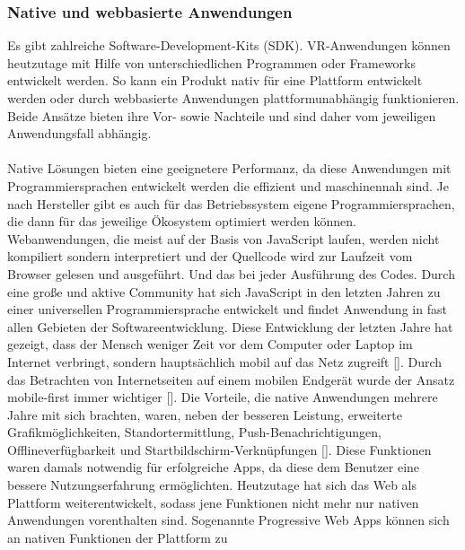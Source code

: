 \documentclass[a4paper,12pt,oneside]{article}
\begin{document}
      \subsubsection{Native und webbasierte Anwendungen}
        Es gibt zahlreiche Software-Development-Kits (SDK).
        VR-Anwendungen können heutzutage mit Hilfe von unterschiedlichen Programmen oder Frameworks entwickelt
        werden. So kann ein Produkt nativ für eine Plattform entwickelt werden oder durch
        webbasierte Anwendungen plattformunabhängig funktionieren.
        Beide Ansätze bieten ihre Vor- sowie Nachteile und sind daher vom jeweiligen 
        Anwendungsfall abhängig. \\ \\
        Native Lösungen bieten eine geeignetere
        Performanz, da diese Anwendungen mit Programmiersprachen entwickelt werden die
        effizient und maschinennah sind. Je nach Hersteller gibt es auch für das 
        Betriebssystem eigene Programmiersprachen, die dann für das jeweilige Ökosystem 
        optimiert werden können. \\
        Webanwendungen, die meist auf der Basis von JavaScript laufen, werden nicht 
        kompiliert sondern interpretiert und der Quellcode wird zur Laufzeit vom Browser 
        gelesen und ausgeführt. Und das bei jeder Ausführung des Codes.
        Durch eine große und aktive Community hat sich JavaScript in den letzten Jahren 
        zu einer universellen Programmiersprache entwickelt und findet Anwendung in
        fast allen Gebieten der Softwareentwicklung.
        Diese Entwicklung der letzten Jahre hat gezeigt, dass der Mensch weniger
        Zeit vor dem Computer oder Laptop im Internet verbringt, sondern hauptsächlich mobil auf das Netz zugreift 
        [\cite[1]{Ater2017}].
        Durch das Betrachten von Internetseiten auf einem mobilen Endgerät wurde der
        Ansatz mobile-first immer wichtiger [\cite[1]{Ater2017}]. Die Vorteile, die native
        Anwendungen mehrere Jahre mit sich brachten, waren, neben der besseren Leistung,
        erweiterte Grafikmöglichkeiten, Standortermittlung, Push-Benachrichtigungen,
        Offlineverfügbarkeit und Startbildschirm-Verknüpfungen [\cite[3]{Ater2017}]. Diese
        Funktionen waren damals notwendig für erfolgreiche Apps, da diese dem
        Benutzer eine bessere Nutzungserfahrung ermöglichten. 
        Heutzutage hat sich das Web als Plattform weiterentwickelt, sodass jene Funktionen nicht
        mehr nur nativen Anwendungen vorenthalten sind.
        Sogenannte Progressive Web Apps können sich an nativen Funktionen der Plattform zu
\end{document}
